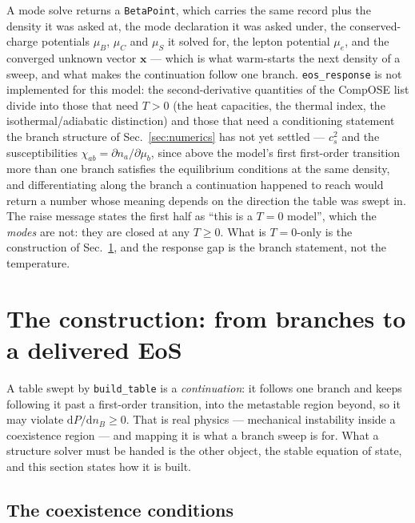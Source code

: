 \documentclass[aps,prc,onecolumn,superscriptaddress,nofootinbib,10pt]{revtex4-2}
\newcommand{\nB}{n_B}
\newcommand{\muB}{\mu_B}
\newcommand{\muC}{\mu_C}
\newcommand{\muS}{\mu_S}
\begin{document}
A mode solve returns a \texttt{BetaPoint}, which carries the same record plus
the density it was asked at, the mode declaration it was asked under, the
conserved-charge potentials $\muB$, $\muC$ and $\muS$ it solved for, the
lepton potential $\mu_e$, and the converged unknown vector $\mathbf{x}$ ---
which is what warm-starts the next density of a sweep, and what makes the
continuation follow one branch. \texttt{eos\_response} is not implemented for this model: the
second-derivative quantities of the CompOSE list divide into those that need
$T > 0$ (the heat capacities, the thermal index, the
isothermal/adiabatic distinction) and those that need a conditioning statement
the branch structure of Sec.~\ref{sec:numerics} has not yet settled ---
$c_s^2$ and the susceptibilities $\chi_{ab} = \partial n_a/\partial\mu_b$,
since above the model's first first-order transition more than one branch
satisfies the equilibrium conditions at the same density, and differentiating
along the branch a continuation happened to reach would return a number whose
meaning depends on the direction the table was swept in. The raise message
states the first half as ``this is a $T = 0$ model'', which the \emph{modes}
are not: they are closed at any $T \ge 0$. What is $T = 0$-only is the
construction of Sec.~\ref{sec:construction}, and the response gap is the
branch statement, not the temperature.

\section{The construction: from branches to a delivered EoS}
\label{sec:construction}

A table swept by \texttt{build\_table} is a \emph{continuation}: it follows one
branch and keeps following it past a first-order transition, into the
metastable region beyond, so it may violate $\mathrm{d} P/\mathrm{d}\nB \ge 0$. That is real
physics --- mechanical instability inside a coexistence region --- and mapping
it is what a branch sweep is for. What a structure solver must be handed is the
other object, the stable equation of state, and this section states how it is
built.

\subsection{The coexistence conditions}
\end{document}
